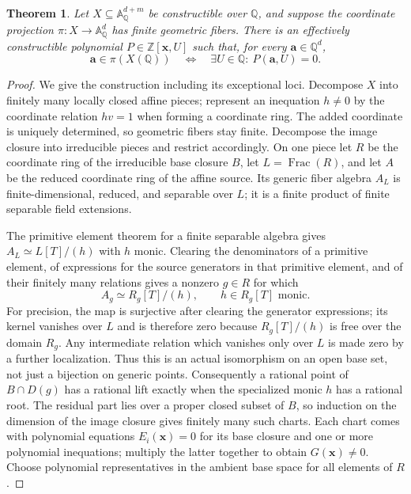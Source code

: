 \documentclass[11pt]{article}
\newtheorem{theorem}{Theorem}[section]
\theoremstyle{definition}
\begin{document}
\begin{theorem}\label{thm:finite-fibre-one-variable}
Let $X\subseteq\mathbb A^{d+m}_{\mathbb Q}$ be constructible over
$\mathbb Q$, and suppose the coordinate projection
$\pi:X\to\mathbb A^d_{\mathbb Q}$ has finite geometric fibers.
There is an effectively constructible polynomial
$P\in\mathbb Z[\mathbf x,U]$ such that, for every $\mathbf a\in\mathbb Q^d$,
\[
 \mathbf a\in\pi(X(\mathbb Q))
 \quad\Longleftrightarrow\quad
 \exists U\in\mathbb Q:\ P(\mathbf a,U)=0.
\]
\end{theorem}
\begin{proof}
We give the construction including its exceptional loci. Decompose $X$
into finitely many locally closed affine pieces; represent an inequation
$h\ne0$ by the coordinate relation $hv=1$ when forming a coordinate ring.
The added coordinate is uniquely determined, so geometric fibers stay
finite. Decompose the image closure into irreducible pieces and restrict
accordingly. On one piece let $R$ be the coordinate ring of the irreducible
base closure $B$, let $L=\operatorname{Frac}(R)$, and let $A$ be the reduced
coordinate ring of the affine source. Its generic fiber algebra
$A_L$ is finite-dimensional, reduced, and separable over $L$; it is a
finite product of finite separable field extensions.

The primitive element theorem for a finite separable algebra gives
$A_L\simeq L[T]/(h)$ with $h$ monic. Clearing the denominators of a
primitive element, of expressions for the source generators in that
primitive element, and of their finitely many relations gives a nonzero
$g\in R$ for which
\[
 A_g\simeq R_g[T]/(h),\qquad h\in R_g[T]\text{ monic}.
\]
For precision, the map is surjective after clearing the generator
expressions; its kernel vanishes over $L$ and is therefore zero because
$R_g[T]/(h)$ is free over the domain $R_g$. Any intermediate relation
which vanishes only over $L$ is made zero by a further localization.
Thus this is an actual isomorphism on an open base set, not just a
bijection on generic points. Consequently a rational point of $B\cap D(g)$
has a rational lift exactly when the specialized monic $h$ has a rational
root. The residual part lies over a proper closed subset of $B$, so
induction on the dimension of the image closure gives finitely many such
charts. Each chart comes with polynomial equations $E_i(\mathbf x)=0$
for its base closure and one or more polynomial inequations; multiply the
latter together to obtain $G(\mathbf x)\ne0$. Choose polynomial
representatives in the ambient base space for all elements of $R$.


\end{proof}
\end{document}
